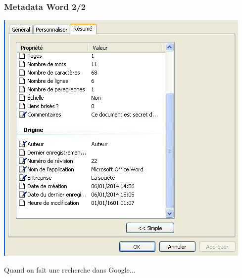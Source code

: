\documentclass{beamer}
\begin{document}
\begin{frame}
\frametitle{Metadata Word 2/2}
\begin{center}
\includegraphics[scale=0.5] {./images/Word02.jpg}
\end{center}
\end{frame}

%

\begin{frame}
\begin{center}
\Huge{Quand on fait une recherche dans Google...}
\end{center}
\end{frame}
\end{document}
